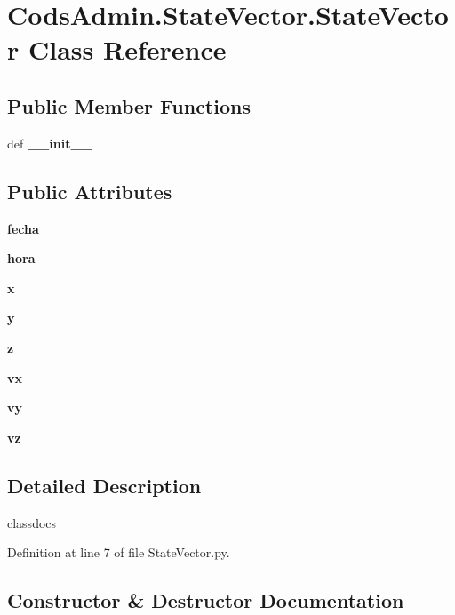 \section{\-Cods\-Admin.\-State\-Vector.\-State\-Vector \-Class \-Reference}
\label{class_cods_admin_1_1_state_vector_1_1_state_vector}
\subsection*{\-Public \-Member \-Functions}
\begin{DoxyCompactItemize}
\item 
def {\bf \-\_\-\-\_\-init\-\_\-\-\_\-}
\end{DoxyCompactItemize}
\subsection*{\-Public \-Attributes}
\begin{DoxyCompactItemize}
\item 
{\bf fecha}
\item 
{\bf hora}
\item 
{\bf x}
\item 
{\bf y}
\item 
{\bf z}
\item 
{\bf vx}
\item 
{\bf vy}
\item 
{\bf vz}
\end{DoxyCompactItemize}


\subsection{\-Detailed \-Description}
\begin{DoxyVerb}
classdocs
\end{DoxyVerb}
 

\-Definition at line 7 of file \-State\-Vector.\-py.



\subsection{\-Constructor \& \-Destructor \-Documentation}
